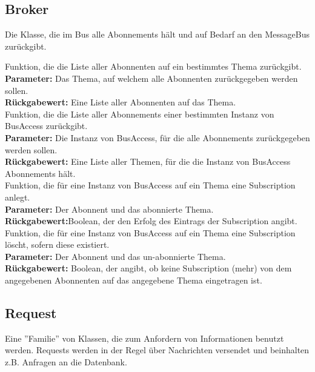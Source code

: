 \documentclass[entwurf.tex]{subfiles}
\begin{document}
		\subsection{Broker}
		\label{Class:Broker}
		Die Klasse, die im Bus alle Abonnements hält und auf Bedarf an den MessageBus zurückgibt.\\
		
		\begin{description}
		Funktion, die die Liste aller Abonnenten auf ein bestimmtes Thema zurückgibt. \\
		\textbf{Parameter:} Das Thema, auf welchem alle Abonnenten zurückgegeben werden sollen.	\\
		\textbf{Rückgabewert:} Eine Liste aller Abonnenten auf das Thema.	\\
		

		Funktion, die die Liste aller Abonnements einer bestimmten Instanz von BusAccess zurückgibt. \\
		\textbf{Parameter:} Die Instanz von BusAccess, für die alle Abonnements zurückgegeben werden sollen.	\\
		\textbf{Rückgabewert:} Eine Liste aller Themen, für die die Instanz von BusAccess Abonnements hält. 	\\
		
		Funktion, die für eine Instanz von BusAccess auf ein Thema eine Subscription anlegt. \\
		\textbf{Parameter:} Der Abonnent und das abonnierte Thema. \\
		\textbf{Rückgabewert:}Boolean, der den Erfolg des Eintrags der Subscription angibt. \\
		
		Funktion, die für eine Instanz von BusAccess auf ein Thema eine Subscription löscht, sofern diese existiert. \\
		\textbf{Parameter:} Der Abonnent und das un-abonnierte Thema. \\
		\textbf{Rückgabewert:} Boolean, der angibt, ob keine Subscription (mehr) von dem angegebenen Abonnenten auf das angegebene Thema eingetragen ist. \\
		\end{description}
		
		\subsection{Request}
		\label{ClassFamily:Request}
		Eine ''Familie'' von Klassen, die zum Anfordern von Informationen benutzt werden. Requests werden in der Regel über Nachrichten versendet und beinhalten z.B. Anfragen an die Datenbank.
		
\end{document}
